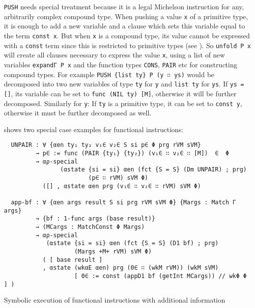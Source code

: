 \verb/PUSH/ needs special treatment because it is a legal Michelson instruction
for any, arbitrarily complex compound type.
When pushing a value \verb/x/ of a primitive type, it is enough to add a new variable
and a clause which sets this variable equal to the term \verb/const x/.
But when \verb/x/ is a compound type, its value cannot be expressed with a \verb/const/ term
since this is restricted to primitive types (see ).
So \verb/unfold P x/ will create all clauses necessary
to express the value \verb/x/, using a list of new variables \verb/expandΓ P x/ and the function
types \verb/CONS/, \verb/PAIR/ etc for constructing compound types.
For example \verb/PUSH {list ty} P (y ∷ ys)/ would be decomposed into two new variables of type
\verb/ty/ for \verb/y/ and \verb/list ty/ for \verb/ys/.
If \verb/ys = []/, its variable can be set to \verb/func (NIL ty) [M]/,
otherwise it will be further decomposed.
Similarly for \verb/y/: If \verb/ty/ is a primitive type, it can be set to \verb/const y/,
otherwise it must be further decomposed as well.

 shows two special case examples for functional instructions:

\begin{listing}[!ht]
\begin{verbatim}
  UNPAIR : ∀ {αen ty₁ ty₂ v₁∈ v₂∈ S si p∈ Φ prg rVM sVM}
         → p∈ := func (PAIR {ty₁} {ty₂}) (v₁∈ ∷ v₂∈ ∷ [M])  ∈  Φ
         → αρ-special 
                (αstate {si = si} αen (fct {S = S} (Dm UNPAIR) ; prg)
                        (p∈ ∷ rVM) sVM Φ)
           ([] , αstate αen prg (v₁∈ ∷ v₂∈ ∷ rVM) sVM Φ)

  app-bf : ∀ {αen args result S si prg rVM sVM Φ} {Margs : Match Γ args}
         → {bf : 1-func args (base result)}
         → (MCargs : MatchConst Φ Margs)
         → αρ-special
            (αstate {si = si} αen (fct {S = S} (D1 bf) ; prg)
                    (Margs +M+ rVM) sVM Φ)
           ( [ base result ]
           , αstate (wkαE αen) prg (0∈ ∷ (wkM rVM)) (wkM sVM) 
                    [ 0∈ := const (appD1 bf (getInt MCargs)) // wkΦ Φ ] )
\end{verbatim}
\caption{Symbolic execution of functional instructions with additional information}
\label{ap-special-func}
\end{listing}

